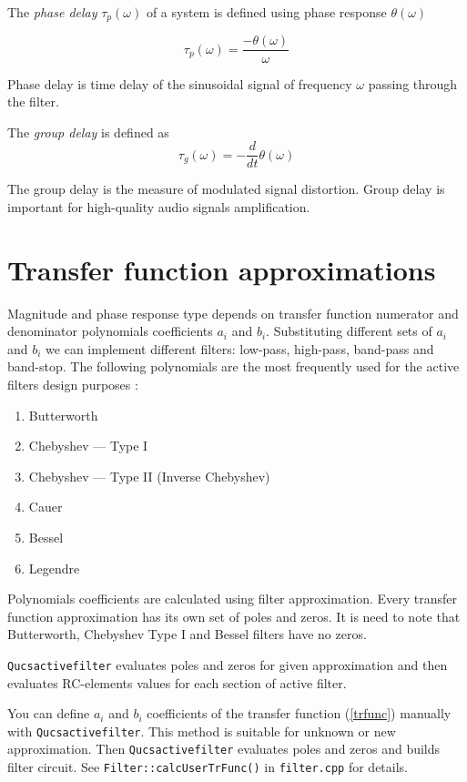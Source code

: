 The \emph{phase delay} $\tau_p(\omega)$ of a system is defined using phase
response $\theta(\omega)$

\begin{equation}
 \tau_p(\omega)=\frac{-\theta(\omega)}{\omega} \label{eq:ph_delay}
\end{equation}

Phase delay is time delay of the sinusoidal signal of frequency $\omega$
passing through the filter.

The \emph{group delay} is defined as
\begin{equation}
 \tau_g (\omega)= -\frac{d}{dt}\theta(\omega)
\end{equation}

The group delay is the measure of modulated signal distortion. Group delay is
important for high-quality audio signals amplification.




\section{Transfer function approximations}


Magnitude and phase response type depends on transfer function numerator and
denominator polynomials coefficients $a_i$ and $b_i$. Substituting different
sets of $a_i$ and $b_i$ we can implement different filters: low-pass, high-pass,
band-pass and band-stop. The following polynomials are the most frequently
used for the active filters design purposes :

\begin{enumerate}
 \item Butterworth
 \item Chebyshev --- Type I
 \item Chebyshev --- Type II (Inverse Chebyshev)
 \item Cauer
 \item Bessel
 \item Legendre
\end{enumerate}

Polynomials coefficients are calculated using filter approximation.
Every transfer function approximation has its own set of poles and zeros. It is
need to note that Butterworth, Chebyshev Type I and Bessel filters have no
zeros. 

\verb|Qucsactivefilter| evaluates poles and zeros for given approximation and
then evaluates RC-elements values for each section of active filter.

You can define $a_i$ and $b_i$ coefficients of the transfer function
(\ref{trfunc}) manually with \verb|Qucsactivefilter|. This method is
suitable for unknown or new approximation. Then \verb|Qucsactivefilter|
evaluates poles and zeros and builds filter circuit. See
\verb|Filter::calcUserTrFunc()| in \verb|filter.cpp| for details.

